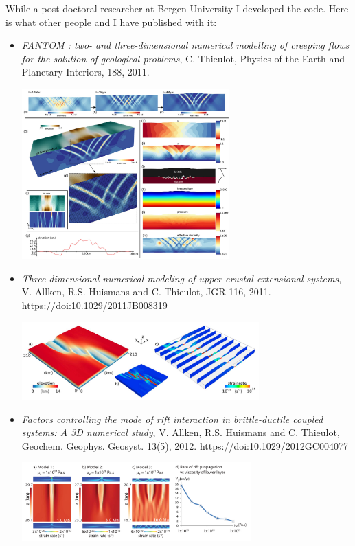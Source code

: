 While a post-doctoral researcher at Bergen University I developed the \fantom code. Here is what other people and I have published with it:

\begin{itemize}

\item {\it FANTOM : two- and three-dimensional numerical modelling of creeping flows for the solution of geological problems}, 
C. Thieulot, Physics of the Earth and Planetary Interiors, 188, 2011.

\begin{center}
\includegraphics[width=8cm]{images/mycodes/thie11_img}
\end{center}


\item {\it Three-dimensional numerical modeling of upper crustal extensional systems}, 
V. Allken, R.S. Huismans and C. Thieulot, JGR 116, 2011. \url{https://doi:10.1029/2011JB008319} 

\begin{center}
\includegraphics[height=3cm]{images/mycodes/alht11_img}
\end{center}


\item {\it Factors controlling the mode of rift interaction in brittle-ductile coupled systems: A 3D numerical study}, 
V. Allken, R.S. Huismans and C. Thieulot, Geochem. Geophys. Geosyst. 13(5), 2012.
\url{https://doi:10.1029/2012GC004077}

\begin{center}
\includegraphics[height=3cm]{images/mycodes/alht12_img}
\end{center}



\end{itemize}
